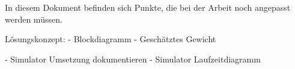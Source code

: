 
In diesem Dokument befinden sich Punkte, die bei der Arbeit noch angepasst werden müssen.


Lösungskonzept:
- Blockdiagramm
- Geschätztes Gewicht

- Simulator Umsetzung dokumentieren
- Simulator Laufzeitdiagramm